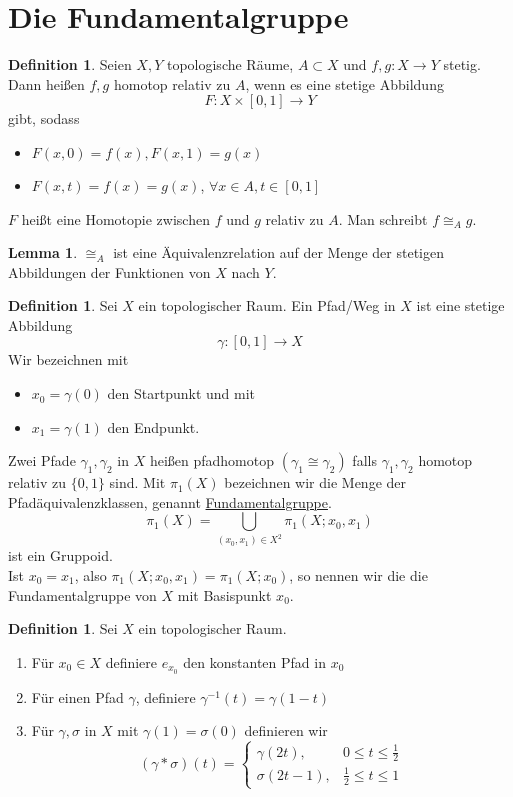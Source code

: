 \documentclass[a4paper, 12pt]{article}
\theoremstyle{plain}
\theoremstyle{definition}
\newtheorem{definition}[theorem]{Definition} %
\theoremstyle{lemma}
\newtheorem{lemma}[theorem]{Lemma}
\theoremstyle{remark}
\theoremstyle{corollary}
\theoremstyle{example}
\begin{document}
\section{Die Fundamentalgruppe}
	\begin{definition}
	Seien $X,Y$ topologische Räume, $A \subset X$ und $f,g: X \to Y$ stetig. Dann heißen $f,g$ homotop relativ zu $A$, wenn es eine stetige Abbildung \[F:X \times [0,1] \to Y\] gibt, sodass \begin{itemize}
		\item $F(x,0) = f(x), F(x,1) = g(x)$
		\item $F(x,t) = f(x) = g(x)$, $\forall x \in A, t \in [0,1]$
	\end{itemize}
	$F$ heißt eine Homotopie zwischen $f$ und $g$ relativ zu $A$. Man schreibt $f \cong_A g$.
	\end{definition}
	\begin{lemma}
		$\cong_A$ ist eine Äquivalenzrelation auf der Menge der stetigen Abbildungen der Funktionen von $X$ nach $Y$.
	\end{lemma}
	\begin{definition}
		Sei $X$ ein topologischer Raum. Ein Pfad/Weg in $X$ ist eine stetige Abbildung \[\gamma: [0,1] \to X\] Wir bezeichnen mit \begin{itemize}
			\item $x_0 = \gamma(0)$ den Startpunkt und mit 
			\item $x_1 = \gamma(1)$ den Endpunkt.
		\end{itemize}
		Zwei Pfade $\gamma_1, \gamma_2$ in $X$ heißen pfadhomotop $(\gamma_1 \cong \gamma_2)$ falls $\gamma_1, \gamma_2$ homotop relativ zu $\{0,1\}$ sind. Mit $\pi_1(X)$ bezeichnen wir die Menge der Pfadäquivalenzklassen, genannt \underline{Fundamentalgruppe}. \[\pi_1(X) = \bigcup_{(x_0,x_1) \in X^2} \pi_1(X;x_0,x_1)\] ist ein Gruppoid.\\
		Ist $x_0=x_1$, also $\pi_1(X;x_0,x_1) = \pi_1(X;x_0)$, so nennen wir die die Fundamentalgruppe von $X$ mit Basispunkt $x_0$.
	\end{definition}
	\begin{definition}
		Sei $X$ ein topologischer Raum. \begin{enumerate}
			\item Für $x_0 \in X$ definiere $e_{x_0}$ den konstanten Pfad in $x_0$
			\item Für einen Pfad $\gamma$, definiere $\gamma^{-1}(t) = \gamma(1-t)$
			\item Für $\gamma,\sigma$ in $X$ mit $\gamma(1) = \sigma(0)$ definieren wir \[(\gamma * \sigma)(t) = \begin{cases}
				\gamma(2t), & 0 \leq t \leq \frac{1}{2}\\
				\sigma(2t-1), & \frac{1}{2} \leq t \leq 1
			\end{cases}\]
		\end{enumerate}
	\end{definition}
\end{document}

